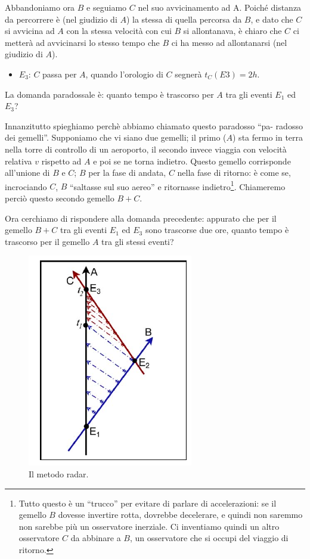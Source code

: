 Abbandoniamo ora $B$ e seguiamo $C$ nel suo avvicinamento ad A. Poiché
distanza da percorrere è (nel giudizio di $A$) la stessa di quella percorsa da $B$,
e dato che $C$ si avvicina ad $A$ con la stessa velocità con cui $B$ si allontanava,
è chiaro che $C$ ci metterà ad avvicinarsi lo stesso tempo che $B$ ci ha messo
ad allontanarsi (nel giudizio di $A$).

\begin{itemize}
\item $E_3$: $C$ passa per $A$, quando l'orologio di $C$ segnerà $t_C (E3 ) = 2h$.
\end{itemize}

La domanda paradossale è: quanto tempo è trascorso per $A$ tra gli eventi $E_1$ 
ed $E_3$?

Innanzitutto spieghiamo perchè abbiamo chiamato questo paradosso ``pa-
radosso dei gemelli''. Supponiamo che vi siano due gemelli; il primo ($A$) sta
fermo in terra nella torre di controllo di un aeroporto, il secondo invece viaggia
con velocità relativa $v$ rispetto ad $A$ e poi se ne torna indietro. Questo
gemello corrisponde all'unione di $B$ e $C$; $B$ per la fase di andata, $C$
nella fase di ritorno: è come se, incrociando $C$, $B$ ``saltasse sul suo aereo'' e
ritornasse indietro\footnote{Tutto questo è un ``trucco'' per evitare di parlare di 
accelerazioni: se il gemello $B$ dovesse invertire rotta, dovrebbe decelerare, e quindi non saremmo 
non sarebbe più un osservatore inerziale. Ci inventiamo quindi un altro
osservatore $C$ da abbinare a $B$, un osservatore che si occupi del viaggio di ritorno.}. 
Chiameremo perciò questo secondo gemello $B+C$.

Ora cerchiamo di rispondere alla domanda precedente: appurato che per
il gemello $B + C$ tra gli eventi $E_1$ ed $E_3$ sono trascorse due ore, quanto tempo
è trascorso per il gemello $A$ tra gli stessi eventi? 

\begin{figure}[htbp]
   \centering
   \includegraphics[scale=1]{immagini/conferme_relspec/radargemelli.png}
   \caption{\label{radar_gemelli}Il metodo radar.}
\end{figure}


